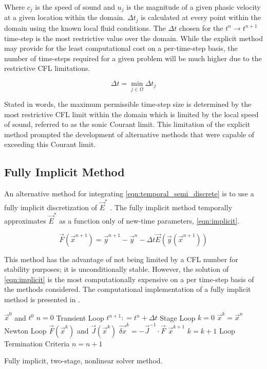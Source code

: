 Where $c_j$ is the speed of sound and $u_j$ is the magnitude of a given phasic velocity at a given location within the domain.
$\Delta t_j$ is calculated at every point within the domain using the known local fluid conditions.
The $\Delta t$ chosen for the $t^{n} \rightarrow t^{n+1}$ time-step is the most restrictive value over the domain.
While the explicit method may provide for the least computational cost on a per-time-step basis, the number of time-steps required for a given problem will be much higher due to the restrictive CFL limitations.

\begin{equation}
\label{eqn:global_cfl}
\Delta t = \min_{j \in \Omega} \Delta t_j
\end{equation}

Stated in words, the maximum permissible time-step size is determined by the most restrictive CFL limit within the domain which is limited by the local speed of sound, referred to as the sonic Courant limit.
This limitation of the explicit method prompted the development of alternative methods that were capable of exceeding this Courant limit.

\subsection{Fully Implicit Method}
\label{subsect:numerics_fully_implicit}
An alternative method for integrating \eqref{eqn:temporal_semi_discrete} is to use a fully implicit discretization of $\vec{E}^{*}$ \cite{Frepoli2003, Barre1990}.
The fully implicit method temporally approximates $\vec{E}^{*}$ as a function only of new-time parameters, \eqref{eqn:implicit}.

\begin{equation}
\label{eqn:implicit}
\vec{F}(\vec{x}^{n+1}) = \vec{y}^{n+1} - \vec{y}^{n} - \Delta t \vec{E}(\vec{y}(\vec{x}^{n+1}))
\end{equation}

This method has the advantage of not being limited by a CFL number for stability purposes; it is unconditionally stable.
However, the solution of \eqref{eqn:implicit} is the most computationally expensive on a per time-step basis of the methods considered.
The computational implementation of a fully implicit method is presented in .

\begin{algo}[H]
\setlength{\baselineskip}{0.625\baselineskip}
\begin{algorithmic}[1]
\Require $\vec{x}^{0}$ and $t^{0}$
\Set $n = 0$
\Loop \; Transient Loop
    \State $t^{n+1} : = t^{n} + \Delta t$
     \; Stage Loop
    \State $k = 0$
    \State $\vec{x}^{k} = \vec{x}^{n}$
    \Loop \; Newton Loop
		\Calculate $\vec{F}(\vec{x}^{k})$ and $\vec{J}(\vec{x}^{k})$
		\Calculate $\vec{\delta x}^k = - \vec{J}^{-1}\cdot\vec{F}$
		\BlackBox $\vec{x}^{k+1}$
		\State $k = k + 1$
		\BlackBox Loop Termination Criteria
	\EndLoop	
	\EndFor
	\State $n = n + 1$
\EndLoop
\end{algorithmic}
\caption{Fully implicit, two-stage, nonlinear solver method.}
\label{algo:implicit}
\end{algo}

